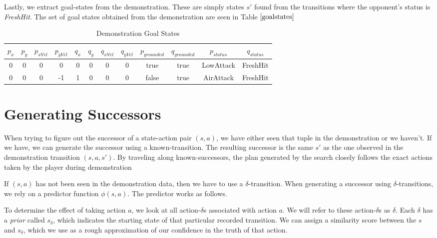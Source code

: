 Lastly, we extract goal-states from the demonstration. These are simply states $s'$ found from the transitions where the opponent's status is \textit{FreshHit}. The set of goal states obtained from the demonstration are seen in Table $\ref{goalstates}$

\begin{table}[h]
	\centering
	\begin{tabular}{| c | c | c | c | c | c | c | c | c | c | c | c |}
		\hline
		$p_x$ & $p_y$ & $p_{xVel}$ & $p_{yVel}$ & $q_x$ & $q_y$ & $q_{xVel}$ & $q_{yVel}$ & $p_{grounded}$ & $q_{grounded}$ & $p_{status}$ & $q_{status}$\\
		\hline
		0 & 0 & 0 & 0 & 0 & 0 & 0 & 0 & true & true & LowAttack & FreshHit\\
		\hline
		0 & 0 & 0 & -1 & 1 & 0 & 0 & 0 & false & true & AirAttack & FreshHit\\
		\hline
	\end{tabular}
	\caption{Demonstration Goal States}
	\label{goalstates}
\end{table}


\section{Generating Successors}

When trying to figure out the successor of a state-action pair $(s,a)$, we have either seen that tuple in the demonstration or we haven't. If we have, we can generate the successor using a known-transition. The resulting successor is the same $s'$ as the one observed in the demonstration transition $(s,a,s')$. By traveling along known-successors, the plan generated by the search closely follows the exact actions taken by the player during demonstration


If $(s,a)$ has not been seen in the demonstration data, then we have to use a $\delta$-transition. When generating a successor using $\delta$-transitions, we rely on a predictor function $\phi(s,a)$. The predictor works as follows.

To determine the effect of taking action $a$, we look at all action-$\delta$s associated with action $a$. We will refer to these action-$\delta$s as $\delta$. Each $\delta$ has a \textit{prior} called $s_{\delta}$, which indicates the starting state of that particular recorded transition. We can assign a similarity score between the $s$ and $s_{\delta}$, which we use as a rough approximation of our confidence in the truth of that action.

